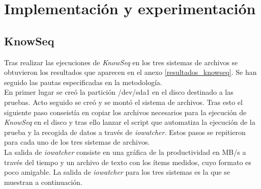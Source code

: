 \cleardoublepage
\clearpage{}

\chapter[Implementación y experimentación]{Implementación y experimentación}

\section{KnowSeq}
Tras realizar las ejecuciones de \textit{KnowSeq} en los tres sistemas de archivos se obtuvieron los resultados que aparecen en el anexo \ref{resultados_knowseq}. Se han seguido las pautas especificadas en la metodología. \\

En primer lugar se creó la partición /dev/sda1 en el disco destinado a las pruebas. Acto seguido se creó y se montó el sistema de archivos. Tras esto el siguiente paso conseistía en  copiar los archivos necesarios para la ejecución de \textit{KnowSeq} en el disco y tras ello lanzar el script que automatiza la ejecución de la prueba y la recogida de datos a través de \textit{iowatcher}. Estos pasos se repitieron para cada uno de los tres sistemas de archivos.\\

La salida de \textit{iowatcher} consiste en una gráfica de la productividad en MB/s a través del tiempo y un archivo de texto con los ítems medidos, cuyo formato es poco amigable. La salida de \textit{iowatcher} para los tres sistemas es la que se muestran a continuación.\\ 

